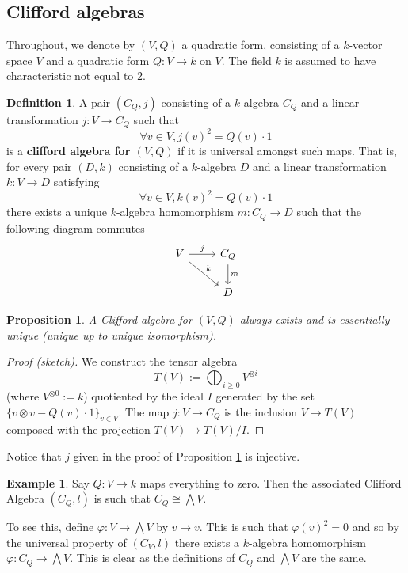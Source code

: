 \documentclass[12pt]{article}
\theoremstyle{plain}
\newtheorem{proposition}[thm]{Proposition}
\theoremstyle{definition}
\newtheorem{defn}[thm]{Definition} %
\newtheorem{example}[thm]{Example}
\newcommand{\lto}{\longrightarrow}
\begin{document}
\subsection{Clifford algebras}
Throughout, we denote by $(V,Q)$ a quadratic form, consisting of a $k$-vector space $V$ and a quadratic form $Q: V \lto k$ on $V$. The field $k$ is assumed to have characteristic not equal to 2.
\begin{defn}
A pair $(C_Q,j)$ consisting of a $k$-algebra $C_Q$ and a linear transformation $j: V \lto C_Q$ such that
\begin{equation}
\forall v \in V, j(v)^2 = Q(v)\cdot 1
\end{equation}
 is a \textbf{clifford algebra for $(V,Q)$} if it is universal amongst such maps. That is, for every pair $(D,k)$ consisting of a $k$-algebra $D$ and a linear transformation $k: V \lto D$ satisfying
 \begin{equation}
 \forall v \in V, k(v)^2 = Q(v)\cdot 1
 \end{equation}
 there exists a unique $k$-algebra homomorphism $m: C_Q \lto D$ such that the following diagram commutes
 \begin{equation}
 \begin{tikzcd}
 V\arrow[r,"j"]\arrow[rd,"k"] & C_Q\arrow[d,"m"]\\
 & D
 \end{tikzcd}
 \end{equation}
\end{defn}
\begin{proposition}\label{prop:clifford_construction}
A Clifford algebra for $(V,Q)$ always exists and is essentially unique (unique up to unique isomorphism).
\end{proposition}
\begin{proof}[Proof (sketch)]
We construct the tensor algebra
\begin{equation}
T(V) := \bigoplus_{i \geq 0}V^{\otimes i}
\end{equation}
(where $V^{\otimes 0} := k$) quotiented by the ideal $I$ generated by the set $\lbrace v \otimes v - Q(v)\cdot 1\rbrace_{v \in V}$. The map $j: V \lto C_Q$ is the inclusion $V \lto T(V)$ composed with the projection $T(V) \lto T(V)/I$.
\end{proof}
Notice that $j$ given in the proof of Proposition \ref{prop:clifford_construction} is injective.
\begin{example}\label{ex:clifford_exterior}
Say $Q: V \lto k$ maps everything to zero. Then the associated Clifford Algebra $(C_Q,l)$ is such that $C_Q \cong \bigwedge V$.

To see this, define $\varphi: V \lto \bigwedge V$ by $v \mapsto v$. This is such that $\varphi(v)^2 = 0$ and so by the universal property of $(C_V,l)$ there exists a $k$-algebra homomorphism $\overline{\varphi}: C_Q \lto \bigwedge V$. This is clear as the definitions of $C_Q$ and $\bigwedge V$ are the same.
\end{example}
\end{document}
